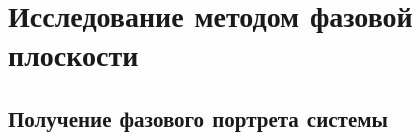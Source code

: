 	\section{Исследование методом фазовой плоскости}
	\subsection{Получение фазового портрета системы}
	


